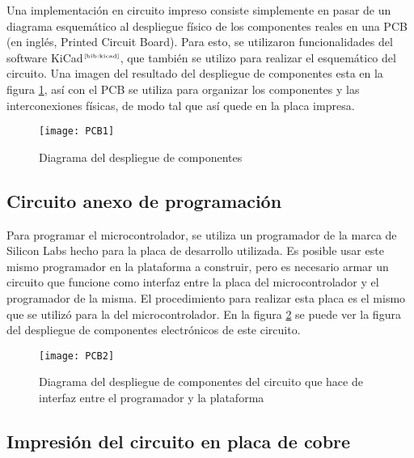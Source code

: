 Una implementaci\'on en circuito impreso consiste simplemente en pasar de un diagrama esquem\'atico al despliegue f\'isico de los componentes reales en una PCB (en ingl\'es, Printed Circuit Board). Para esto, se utilizaron funcionalidades del software KiCad$^{\tiny{\cite{bib:kicad}}}$, que tambi\'en se utilizo para realizar el esquem\'atico del circuito. Una imagen del resultado del despliegue de componentes esta en la figura \ref{fig:PCB1}, as\'i con el PCB se utiliza para organizar los componentes y las interconexiones f\'isicas, de modo tal que as\'i quede en la placa impresa.


\begin{figure}[h]
  \centering
  \texttt{[image: PCB1]}
  \caption{\small Diagrama del despliegue de componentes}\label{fig:PCB1}
\end{figure}


\subsection{Circuito anexo de programaci\'on} %
\label{sub:circuito_anexo_de_programacion}

Para programar el microcontrolador, se utiliza un programador de la marca de Silicon Labs hecho para la placa de desarrollo utilizada. Es posible usar este mismo programador en la plataforma a construir, pero es necesario armar un circuito que funcione como interfaz entre la placa del microcontrolador y el programador de la misma. El procedimiento para realizar esta placa es el mismo que se utiliz\'o para la del microcontrolador. En la figura \ref{fig:PCB2} se puede ver la figura del despliegue de componentes electr\'onicos de este circuito.

\begin{figure}[/h]
  \centering
  \texttt{[image: PCB2]}
  \caption{\small Diagrama del despliegue de componentes del circuito que hace de interfaz entre el programador y la plataforma}\label{fig:PCB2}
\end{figure}


\subsection{Impresi\'on del circuito en placa de cobre} %
\label{sub:impresion_del_circuito_en_placa_de_cobre}

